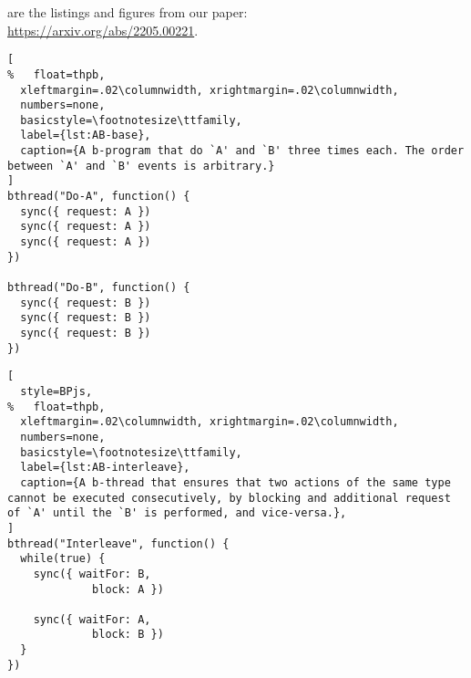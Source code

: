 \documentclass[10pt,journal,compsoc]{IEEEtran}
\theoremstyle{definition}
\begin{document}
%
\IEEEpeerreviewmaketitle

{} are the listings and figures from our paper:\\\url{https://arxiv.org/abs/2205.00221}.\vspace{2em}

\begin{lstlisting}[
%   float=thpb,
  xleftmargin=.02\columnwidth, xrightmargin=.02\columnwidth,
  numbers=none,
  basicstyle=\footnotesize\ttfamily,
  label={lst:AB-base},
  caption={A b-program that do `A' and `B' three times each. The order between `A' and `B' events is arbitrary.}
]
bthread("Do-A", function() {
  sync({ request: A })
  sync({ request: A })
  sync({ request: A })
})

bthread("Do-B", function() {
  sync({ request: B })
  sync({ request: B })
  sync({ request: B })
})
\end{lstlisting}

\begin{lstlisting}[
  style=BPjs,
%   float=thpb,
  xleftmargin=.02\columnwidth, xrightmargin=.02\columnwidth,
  numbers=none,
  basicstyle=\footnotesize\ttfamily,
  label={lst:AB-interleave},
  caption={A b-thread that ensures that two actions of the same type cannot be executed consecutively, by blocking and additional request of `A' until the `B' is performed, and vice-versa.},
]
bthread("Interleave", function() {
  while(true) {
    sync({ waitFor: B, 
             block: A })
             
    sync({ waitFor: A, 
             block: B })
  }
})
\end{lstlisting}
\end{document}
